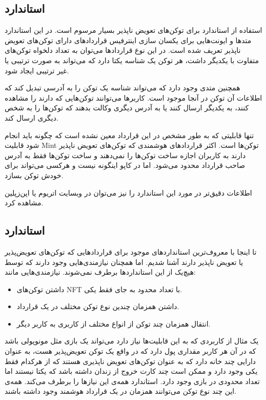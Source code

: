 \subsection{استاندارد }
استفاده از استاندارد
برای توکن‌های تعویض ناپذیر بسیار مرسوم است. در این استاندارد متدها و ایونت‌هایی برای یکسان سازی اینترفیس قراردادهای دارای توکن‌های تعویض ناپذیر تعریف شده است. در این نوع قرارداد‌ها می‌توان به تعداد دلخواه توکن‌های متفاوت با یکدیگر داشت، هر توکن یک شناسه یکتا دارد که می‌تواند به صورت ترتیبی یا غیر ترتیبی ایجاد شود.

همچنین متدی وجود دارد که می‌تواند شناسه یک توکن را به آدرسی تبدیل کند که اطلاعات آن توکن در آنجا موجود است. کاربرها می‌توانند توکن‌هایی که دارند را مشاهده کنند، به یکدیگر ارسال کنند یا به آدرس دیگری وکالت بدهند که توکن‌ها را به شخص دیگری ارسال کند.

تنها قابلیتی که به طور مشخص در این قرارداد معین نشده است که چگونه باید انجام شود قابلیت
\gls{Mint}
توکن‌ها است. اکثر قراردادهای هوشمندی که توکن‌های تعویض ناپذیر دارند به کاربران اجازه ساخت توکن‌ها را نمی‌دهند و ساخت توکن‌ها فقط به آدرس صاحب قرارداد محدود می‌شود. اما در کاپو اینگونه نیست و هرکسی می‌تواند برای خودش توکن بسازد.

اطلاعات دقیق‌تر در مورد این استاندارد را نیز می‌توان در وبسایت
اتریوم
یا
اپن‌زپلین
مشاهده کرد.


\subsection{استاندارد }
تا اینجا با معروف‌ترین استاندارد‌های موجود برای قراردادهایی که توکن‌های تعویض‌پذیر یا تعویض ناپذیر دارند آشنا شدیم. اما همچنان نیازمندی‌هایی وجود دارند که توسط هیچ‌یک از این استانداردها برطرف نمی‌شوند. نیازمندی‌هایی مانند:
\begin{itemize}
	\item
داشتن توکن‌های NFT با تعداد محدود به جای فقط یکی.
	\item
داشتن همزمان چندین نوع توکن مختلف در یک قرارداد.
	\item
انتقال همزمان چند توکن از انواع مختلف از کاربری به کاربر دیگر.
\end{itemize}

یک مثال از کاربردی که به این قابلیت‌ها نیاز دارد می‌تواند یک بازی مثل مونوپولی باشد که در آن هر کاربر مقداری پول دارد که در واقع یک توکن تعویض‌پذیر هست، به عنوان دارایی چند خانه دارد که به عنوان توکن‌های تعویض ناپذیری هستند که از هرکدام فقط یکی وجود دارد و ممکن است چند کارت خروج از زندان داشته باشد که یکتا نیستند اما تعداد محدودی در بازی وجود دارد. استاندارد
همه‌ی این نیازها را برطرف می‌کند. همه‌ی این چند نوع توکن می‌توانند همزمان در یک قرارداد هوشمند وجود داشته باشند.

